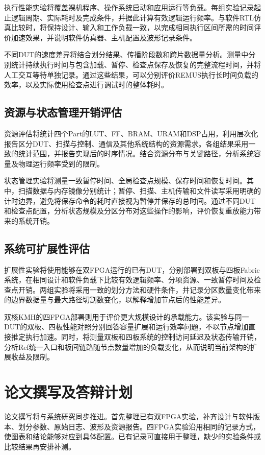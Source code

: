 执行性能实验将覆盖裸机程序、操作系统启动和应用运行等负载。每组实验记录起止逻辑周期、实际耗时及完成条件，并据此计算有效逻辑运行频率。与软件RTL仿真比较时，将保持设计、输入和工作负载一致，以完成相同执行区间所需的时间评价加速效果，并说明软件仿真器、主机配置及波形记录条件。

不同DUT的速度差异将结合划分结果、传播阶段数和跨片数据量分析。测量中分别统计持续执行时间与包含加载、暂停、检查点保存及恢复的完整流程时间，并将人工交互等待单独记录。通过这些结果，可以分别评价REMUS执行长时间负载的效率，以及实际使用检查点进行调试时的整体耗时。

\subsection{资源与状态管理开销评估}

资源评估将统计四个Part的LUT、FF、BRAM、URAM和DSP占用，利用层次化报告区分DUT、扫描与控制、通信及其他系统结构的资源需求。各组结果采用一致的统计范围，并报告实现后的时序情况。结合资源分布与关键路径，分析系统容量及物理运行频率受到的限制。

状态管理实验将测量一致暂停时间、全局检查点规模、保存时间和恢复时间。其中，扫描数据与内存镜像分别统计；暂停、扫描、主机传输和文件读写采用明确的计时边界，避免将保存命令的耗时直接视为暂停并保存的总时间。通过不同DUT和检查点配置，分析状态规模及分区分布对这些操作的影响，评价恢复重放能力带来的系统开销。

\subsection{系统可扩展性评估}

扩展性实验将使用能够在双FPGA运行的已有DUT，分别部署到双板与四板Fabric系统，在相同设计和软件负载下比较有效逻辑频率、分项资源、一致暂停时间及检查点开销。两组实验将采用一致的划分方法和硬件条件，并记录分区数量变化带来的边界数据量与最大路径切割数变化，以解释增加节点后的性能差异。

双核KMH的四FPGA部署则用于评价更大规模设计的承载能力。该实验与同一DUT的双板、四板性能对照分别回答容量扩展和运行效率问题，不以节点增加直接推定执行加速。同时，将测量双板和四板系统的控制访问延迟及状态传输开销，分析Ref统一入口和板间链路随节点数量增加的负载变化，从而说明当前架构的扩展收益及限制。

\section{论文撰写及答辩计划}

论文撰写将与系统研究同步推进。首先整理已有双FPGA实验，补齐设计与软件版本、划分参数、原始日志、波形及资源报告。四FPGA实验沿用相同的记录方式，使图表和结论能够对应到具体配置。已有记录可直接用于整理，缺少的实验条件或比较结果再安排补测。

